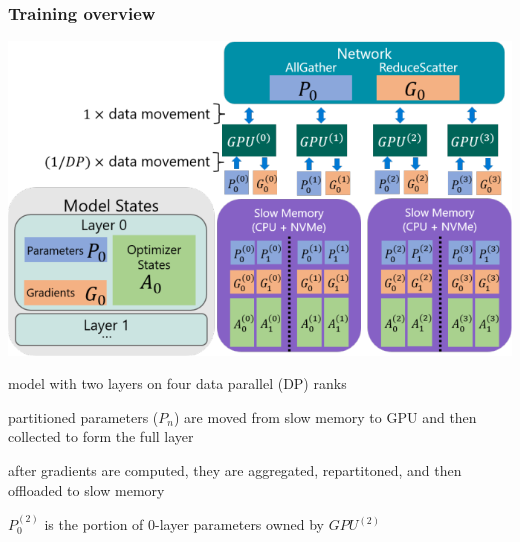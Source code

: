 \documentclass{beamer}
\begin{document}
\begin{frame}
    \frametitle{Training overview}
    \begin{center}
        \includegraphics[scale=1.3]{img/zero_infinity_overview.png}
    \end{center}
    \begin{itemize}
    	\tiny{\item model with two layers on four data parallel (DP) ranks}
    	\tiny{\item partitioned parameters ($P_n$) are moved from slow memory to GPU and then collected to form the full layer}
    	\tiny{\item after gradients are computed, they are aggregated, repartitoned, and then offloaded to slow memory}
    	\tiny{\item $P_0^{(2)}$ is the portion of $0$-layer parameters owned by $GPU^{(2)}$}
    \end{itemize}
\end{frame}
\end{document}
